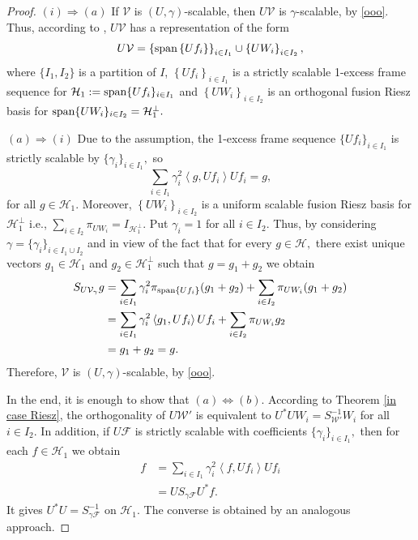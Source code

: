 \documentclass[sn-mathphys-num]{sn-jnl}%
\theoremstyle{definition}
\theoremstyle{remark}
\numberwithin{equation}{section}
\begin{document}
\begin{proof}
$(i)\Rightarrow(a)$ If $\mathcal{V}$ is $(U,\gamma)$-scalable, then $U\mathcal{V}$ is $\gamma$-scalable, by \eqref{ooo}. Thus, according to \cite[Theorem 3.9]{scaling weights}, $U\mathcal{V}$  has a representation of the form
\begin{equation*}
U\mathcal{V}=\left\lbrace \textnormal{span}\left\lbrace Uf_{i} \right\rbrace \right\rbrace _{i \in I_{1}}\cup \left\lbrace UW_{i} \right\rbrace _{i \in I_{2}},
\end{equation*}
where $\{I_{1},I_{2}\}$ is a partition of $I$, ${\left\lbrace Uf_{i} \right\rbrace _{i \in I_{1}}}$ is a strictly scalable 1-excess frame sequence for $\mathcal{H}_{1}:=\textnormal{span}\{Uf_{i}\}_{i \in I_{1}}$ and $\left\lbrace UW_{i} \right\rbrace _{i \in I_{2}}$ is an orthogonal fusion Riesz basis for $\textnormal{span}\{UW_{i}\}_{i \in I_{2}}=\mathcal{H}_{1}^{\perp}.$

$(a)\Rightarrow(i)$ Due to the assumption, the 1-excess frame sequence $\{Uf_{i}\}_{i \in I_{1}}$ is strictly scalable by $\{\gamma_{i}\}_{i \in I_{1}},$ so
\begin{equation*}
\sum_{i \in I_{1}}\gamma_{i}^{2}\left\langle g,Uf_{i} \right\rangle Uf_{i}=g,
\end{equation*}
for all $g \in \mathcal{H}_{1}.$ Moreover, $\left\lbrace UW_{i} \right\rbrace _{i \in I_{2}}$ is a uniform scalable fusion Riesz basis for $\mathcal{H}_{1}^{\perp}$ i.e., $\sum_{i \in I_{2}}\pi_{UW_{i}}=I_{\mathcal{H}_{1}^{\perp}}.$ Put $\gamma_{i}=1$ for all $i \in I_{2}.$ Thus, by considering $\gamma=\{\gamma_{i}\}_{i \in I_{1}\cup I_{2}}$ and in view of the fact that for every $g \in \mathcal{H},$ there exist unique vectors $g_{1} \in \mathcal{H}_{1}$ and $g_{2} \in \mathcal{H}_{1}^{\perp}$ such that $g=g_{1}+g_{2}$ we obtain 
\begin{align*}
S_{U\mathcal{V}_{\gamma}}g&=\sum_{i \in I_{1}}\gamma_{i}^{2}\pi_{\textnormal{span}\{Uf_{i}\}}(g_{1}+g_{2})+\sum_{i \in I_{2}}\pi_{UW_{i}}(g_{1}+g_{2})
\\&=\sum_{i \in I_{1}}\gamma_{i}^{2}\left\langle g_{1},Uf_{i} \right\rangle Uf_{i}+\sum_{i \in I_{2}}\pi_{UW_{i}}g_{2}
\\&=g_{1}+g_{2}=g.
\end{align*}
Therefore, $\mathcal{V}$ is $(U,\gamma)$-scalable, by \eqref{ooo}.

In the end, it is enough to show that $(a)\Leftrightarrow(b)$. According to Theorem \ref{in case Riesz}, the orthogonality of $U\mathcal{W}'$ is equivalent to $U^{*}UW_{i}=S_{\mathcal{W}'}^{-1}W_{i}$ for all $i \in I_{2}$. In addition, if $U\mathcal{F}$ is strictly scalable with coefficients $\{\gamma_{i}\}_{i \in I_{1}},$ then for each $f \in \mathcal{H}_{1}$ we obtain 
\begin{align*}
f&=\sum_{i \in I_{1}}\gamma_{i}^{2}\left\langle f,Uf_{i} \right\rangle Uf_{i}
\\&=US_{\gamma \mathcal{F}}U^{*}f.
\end{align*}
It gives $U^{*}U=S_{\gamma \mathcal{F}}^{-1}$ on $\mathcal{H}_{1}.$ The converse is obtained by an analogous approach.
\end{proof}
\end{document}
